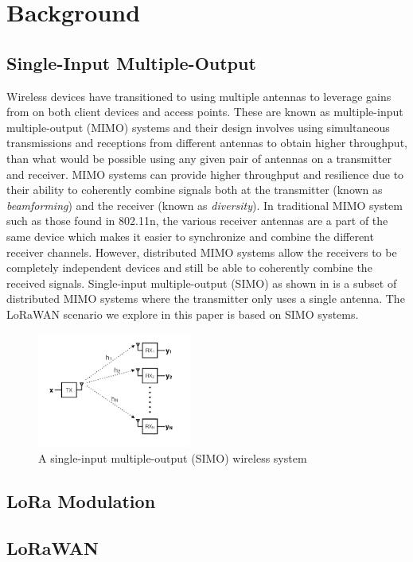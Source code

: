 \section{Background}
\label{sec:background}

\subsection{Single-Input Multiple-Output}
\label{sec:simo}

Wireless devices have transitioned to using multiple antennas to leverage gains from on both client devices and access points.
These are known as multiple-input multiple-output (MIMO) systems and their design involves using simultaneous transmissions and receptions from different antennas to obtain higher throughput, than what would be possible using any given pair of antennas on a transmitter and receiver.
MIMO systems can provide higher throughput and resilience due to their ability to coherently combine signals both at the transmitter (known as \textit{beamforming}) and the receiver (known as \textit{diversity}).
In traditional MIMO system such as those found in 802.11n, the various receiver antennas are a part of the same device which makes it easier to synchronize and combine the different receiver channels.
However, distributed MIMO systems allow the receivers to be completely independent devices and still be able to coherently combine the received signals.
Single-input multiple-output (SIMO) as shown in  is a subset of distributed MIMO systems where the transmitter only uses a single antenna.
The LoRaWAN scenario we explore in this paper is based on SIMO systems.

\begin{figure}[!htb]
    \centering
    \includegraphics[width=0.45\textwidth]{location-aware-network/figures/SIMO}
    \caption{A single-input multiple-output (SIMO) wireless system}
    \label{fig:simo}
\end{figure}

\subsection{LoRa Modulation}
\label{sec:lora}

\subsection{LoRaWAN}
\label{sec:lorawan}